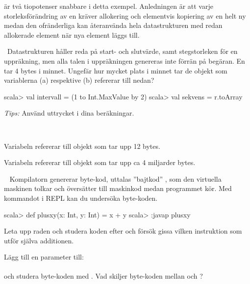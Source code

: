 \SubtaskSolved {} är två tiopotenser snabbare i detta exempel. Anledningen är att varje storleksförändring av en  kräver allokering och elementvis kopiering av en helt ny  medan den ofränderliga  kan återanvända hela datastrukturen med redan allokerade element när nya element läggs till.

\QUESTEND





\QUESTBEGIN

\Task \what~Datastrukturen  håller reda på start- och slutvärde, samt stegstorleken för en uppräkning, men alla talen i uppräkningen genereras inte förrän på begäran. En  tar 4 bytes i minnet. Ungefär hur mycket plats i minnet tar de objekt som variablerna (a)  respektive (b)  refererar till nedan?

\begin{REPL}
scala> val intervall = (1 to Int.MaxValue by 2)
scala> val sekvens = r.toArray
\end{REPL}
\emph{Tips:} Använd uttrycket  i dina beräkningar.


\SOLUTION

\TaskSolved  \what~

\SubtaskSolved Variabeln  refererar till objekt som tar upp 12 bytes.

\SubtaskSolved Variabeln  refererar till objekt som tar upp ca 4 miljarder bytes.

\QUESTEND





\QUESTBEGIN

\Task  \what~  Kompilatorn genererar byte-kod, uttalas ''bajtkod'' , som den virtuella maskinen tolkar och översätter till maskinkod medan programmet kör. Med kommandot  i REPL kan du undersöka byte-koden.
\begin{REPL}
scala> def plusxy(x: Int, y: Int) = x + y
scala> :javap plusxy
\end{REPL}

\Subtask Leta upp raden  och studera koden efter  och försök gissa vilken instruktion som utför själva additionen.

\Subtask Lägg till en parameter till: \\ 
\\ och studera byte-koden med . Vad skiljer byte-koden mellan  och ?

